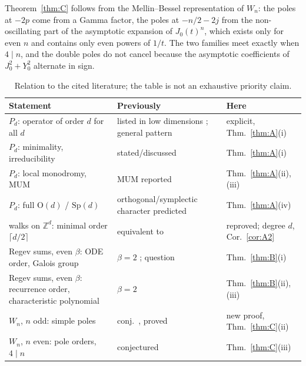 \documentclass[11pt]{amsart}
\theoremstyle{definition}
\newcommand{\Z}{\mathbb Z}
\newcommand{\Sp}{\mathrm{Sp}}
\newcommand{\Ort}{\mathrm{O}}
\begin{document}
Theorem~\ref{thm:C} follows from the Mellin--Bessel representation of $W_n$: the poles at $-2p$ come from a Gamma factor, the poles at $-n/2-2j$ from the non-oscillating part of the asymptotic expansion of $J_0(t)^n$, which exists only for even $n$ and contains only even powers of $1/t$. The two families meet exactly when $4\mid n$, and the double poles do not cancel because the asymptotic coefficients of $J_0^2+Y_0^2$ alternate in sign.

\begin{table}[ht]
\centering
\small
\begin{tabular}{@{}>{\raggedright\arraybackslash}p{5.4cm}>{\raggedright\arraybackslash}p{4.4cm}>{\raggedright\arraybackslash}p{3.6cm}@{}}
\toprule
Statement&Previously&Here\\
\midrule
$P_d$: operator of order $d$ for all $d$&listed in low dimensions \cite{Gut10}; general pattern \cite{HMZ25}&explicit, Thm.~\ref{thm:A}(i)\\
$P_d$: minimality, irreducibility&stated/discussed \cite{BHMW14,HMZ25}&Thm.~\ref{thm:A}(i)\\
$P_d$: local monodromy, MUM&MUM reported \cite{HMZ25}&Thm.~\ref{thm:A}(ii),(iii)\\
$P_d$: full $\Ort(d)$ / $\Sp(d)$&orthogonal/symplectic character predicted \cite[\S1.5]{HMZ25}&Thm.~\ref{thm:A}(iv)\\
walks on $\Z^d$: minimal order $\lceil d/2\rceil$&equivalent to \cite[Thm.~1.7(c)]{KVB}&reproved; degree $d$, Cor.~\ref{cor:A2}\\
Regev sums, even $\beta$: ODE order, Galois group&$\beta=2$ \cite{KBT}; question \cite[\S4]{Mis19}&Thm.~\ref{thm:B}(i)\\
Regev sums, even $\beta$: recurrence order, characteristic polynomial&$\beta=2$ \cite{KBT}&Thm.~\ref{thm:B}(ii),(iii)\\
$W_n$, $n$ odd: simple poles&conj.\ \cite{BNSW11,BSW13}, proved \cite{Zho19}&new proof, Thm.~\ref{thm:C}(ii)\\
$W_n$, $n$ even: pole orders, $4\mid n$&conjectured \cite[Rem.~5]{BNSW11}&Thm.~\ref{thm:C}(iii)\\
\bottomrule
\end{tabular}
\caption{Relation to the cited literature; the table is not an exhaustive priority claim.}\label{tab:status}
\end{table}
\end{document}
